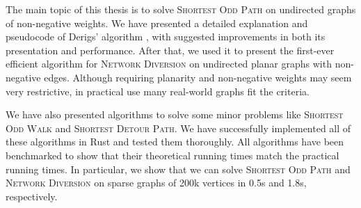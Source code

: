 The main topic of this thesis is to solve \textsc{Shortest Odd Path} on undirected graphs of non-negative weights. We have presented a detailed explanation and pseudocode of Derigs' algorithm \cite{source:derigs_shortest_odd_path}, with suggested improvements in both its presentation and performance. After that, we used it to present the first-ever efficient algorithm for \textsc{Network Diversion} on undirected planar graphs with non-negative edges. Although requiring planarity and non-negative weights may seem very restrictive, in practical use many real-world graphs fit the criteria.

We have also presented algorithms to solve some minor problems like \textsc{Shortest Odd Walk} and \textsc{Shortest Detour Path}. We have successfully implemented all of these algorithms in Rust and tested them thoroughly. All algorithms have been benchmarked to show that their theoretical running times match the practical running times. In particular, we show that we can solve \textsc{Shortest Odd Path} and \textsc{Network Diversion} on sparse graphs of 200k vertices in 0.5s and 1.8s, respectively.
